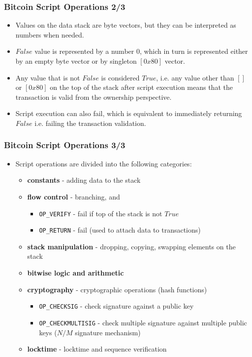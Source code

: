 \documentclass{beamer}
\begin{document}
\begin{frame}[fragile]
  \frametitle{Bitcoin Script Operations 2/3}
  \begin{itemize}
  \item Values on the data stack are byte vectors, but they can be interpreted
    as numbers when needed.
  \item $False$ value is represented by a number 0, which in turn is represented
    either by an empty byte vector or by singleton $[0x80]$ vector.
  \item Any value that is not $False$ is considered $True$, i.e. any value other
    than $[]$ or $[0x80]$ on the top of the stack after script execution means
    that the transaction is valid from the ownership perspective.
  \item Script execution can also fail, which is equivalent to immediately
    returning $False$ i.e. failing the transaction validation.
  \end{itemize}
\end{frame}

\begin{frame}[fragile]
  \frametitle{Bitcoin Script Operations 3/3}
  \begin{itemize}
  \item Script operations are divided into the following categories:
    \begin{itemize}
    \item \textbf{constants} - adding data to the stack
    \item \textbf{flow control} - branching, and
      \begin{itemize}
      \item \texttt{OP_VERIFY} - fail if top of the stack is not
        $True$
      \item \texttt{OP_RETURN} - fail (used to attach data to
        transactions)
      \end{itemize}
    \item \textbf{stack manipulation} - dropping, copying, swapping elements on
      the stack
    \item \textbf{bitwise logic and arithmetic}
    \item \textbf{cryptography} - cryptographic operations (hash functions)
      \begin{itemize}
      \item \texttt{OP_CHECKSIG} - check signature against a public
        key
      \item \texttt{OP_CHECKMULTISIG} - check multiple signature
        against multiple public keys ($N/M$ signature mechanism)
      \end{itemize}
    \item \textbf{locktime} - locktime and sequence verification
    \end{itemize}
  \end{itemize}
\end{frame}
\end{document}
